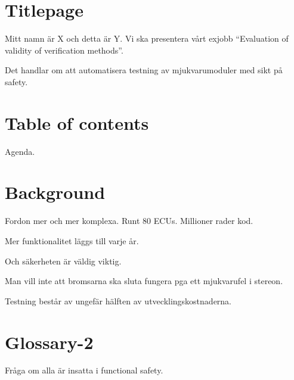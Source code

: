 \documentclass[a4paper]{article}
\begin{document}
\section{Titlepage}
Mitt namn är X och detta är Y. Vi ska presentera vårt exjobb
``Evaluation of validity of verification methods''.

Det handlar om att automatisera testning av mjukvarumoduler med sikt
på safety.

\section{Table of contents}
Agenda.

\section{Background}
Fordon mer och mer komplexa. Runt 80 ECUs. Millioner rader kod.


Mer funktionalitet läggs till varje år.

Och säkerheten är väldig viktig.

Man vill inte att bromsarna ska sluta fungera pga ett mjukvarufel i stereon.

Testning består av ungefär hälften av utvecklingskostnaderna.

\section{Glossary-2}
Fråga om alla är insatta i functional safety.
\end{document}
